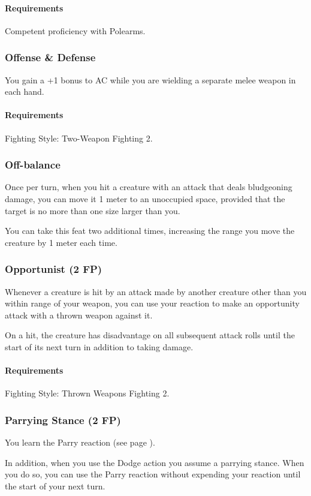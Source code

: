     \paragraph{Requirements} Competent proficiency with Polearms.
\subsubsection{Offense \& Defense} \label{feat::offenseanddefense}
    You gain a +1 bonus to AC while you are wielding a separate melee weapon in each hand.
    \paragraph{Requirements} Fighting Style: Two-Weapon Fighting 2.
\subsubsection{Off-balance} \label{feat::offbalance}
    Once per turn, when you hit a creature with an attack that deals bludgeoning damage, you can move it 1 meter to an unoccupied space, provided that the target is no more than one size larger than you.

    You can take this feat two additional times, increasing the range you move the creature by 1 meter each time.
\subsubsection{Opportunist (2 FP)} \label{feat::opportunist}
    Whenever a creature is hit by an attack made by another creature other than you within range of your weapon, you can use your reaction to make an opportunity attack with a thrown weapon against it.

    On a hit, the creature has disadvantage on all subsequent attack rolls until the start of its next turn in addition to taking damage.
    \paragraph{Requirements} Fighting Style: Thrown Weapons Fighting 2.
\subsubsection{Parrying Stance (2 FP)} \label{feat::parryingstance}
    You learn the Parry reaction (see page \pageref{act::parry}).

    In addition, when you use the Dodge action you assume a parrying stance.
    When you do so, you can use the Parry reaction without expending your reaction until the start of your next turn.
